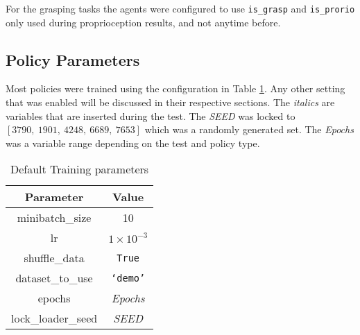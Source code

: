 For the grasping tasks the agents were configured to use \verb|is_grasp| and \verb|is_prorio| only used during proprioception results, and not anytime before.

\subsection{Policy Parameters}
Most policies were trained using the configuration in Table \ref{tab:eval-training-params}. Any other setting that was enabled will be discussed in their respective sections. The \emph{italics} are variables that are inserted during  the test. The \emph{SEED} was locked to \( \left[ 3790, ~1901, ~4248, ~6689, ~7653 \right] \) which was a randomly generated set. The \emph{Epochs} was a variable range depending on the test and policy type.

\begin{table}[ht]
\centering
  \begin{tabular}{|| c | c ||}
  \hline
  Parameter & Value \\
  \hline
  minibatch\_size & 10 \\
  lr & $1\times 10^{-3}$ \\
  shuffle\_data & \texttt{True} \\
  dataset\_to\_use & \texttt{`demo'} \\
  epochs & \emph{Epochs} \\
  lock\_loader\_seed & \emph{SEED} \\
  \hline
  \end{tabular}\caption{Default Training parameters}\label{tab:eval-training-params}
\end{table}